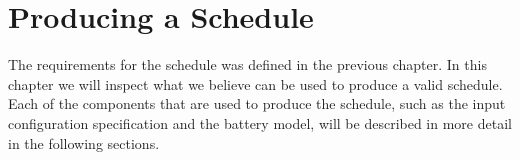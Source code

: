\chapter{Producing a Schedule} \label{cha:produce}
The requirements for the schedule was defined in the previous chapter. In this chapter we will inspect what we believe can be used to produce a valid schedule. Each of the components that are used to produce the schedule, such as the input configuration specification and the battery model, will be described in more detail in the following sections.








